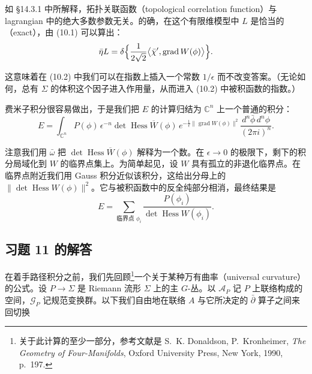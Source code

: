 如 §14.3.1 中所解释，拓扑关联函数（topological correlation function）与 lagrangian 中的绝大多数参数无关。的确，在这个有限维模型中 $L$ 是恰当的（exact），由 (10.1) 可以算出：
\[
  \bar\eta L=\delta\Bigl\{\frac{1}{2\sqrt2}\bigl\langle\bar\chi',\operatorname{grad}W(\phi)\bigr\rangle\Bigr\}.
\]

这意味着在 (10.2) 中我们可以在指数上插入一个常数 $1/\epsilon$ 而不改变答案。（无论如何，总有 $\Sigma$ 的体积这个因子进入作用量，从而进入 (10.2) 中被积函数的指数。）


费米子积分很容易做出，于是我们把 $E$ 的计算归结为 $\mathbb{C}^n$ 上一个普通的积分：
\[
  E=\int_{\mathbb{C}^n}P(\phi)\,\epsilon^{-n}\det\operatorname{Hess}\overline{W}(\phi)\,
  e^{-\frac1\epsilon\|\operatorname{grad}W(\phi)\|^2}\frac{d^n\bar\phi\,d^n\phi}{(2\pi i)^n}.
\]

注意我们用 $\bar\omega$ 把 $\det\operatorname{Hess}\overline{W}(\phi)$ 解释为一个数。在 $\epsilon\to0$ 的极限下，剩下的积分局域化到 $W$ 的临界点集上。为简单起见，设 $W$ 具有孤立的非退化临界点。在临界点附近我们用 Gauss 积分近似该积分，这给出分母上的 $\|\det\operatorname{Hess}W(\phi)\|^2$。它与被积函数中的反全纯部分相消，最终结果是
\[
  E=\sum_{\text{临界点 }\phi_i}\frac{P(\phi_i)}{\det\operatorname{Hess}W(\phi_i)}.
\]

\subsection{习题 11 的解答}

在着手路径积分之前，我们先回顾\footnote{%
关于此计算的至少一部分，参考文献是 S.~K. Donaldson, P.~Kronheimer, \emph{The Geometry of Four-Manifolds}, Oxford University Press, New York, 1990, p.~197.}一个关于某种万有曲率（universal curvature）的公式。设 $P\to\Sigma$ 是 Riemann 流形 $\Sigma$ 上的主 $G$-丛。以 $\mathcal{A}_P$ 记 $P$ 上联络构成的空间，$\mathcal{G}_P$ 记规范变换群。以下我们自由地在联络 $A$ 与它所决定的 $\bar\partial$ 算子之间来回切换


